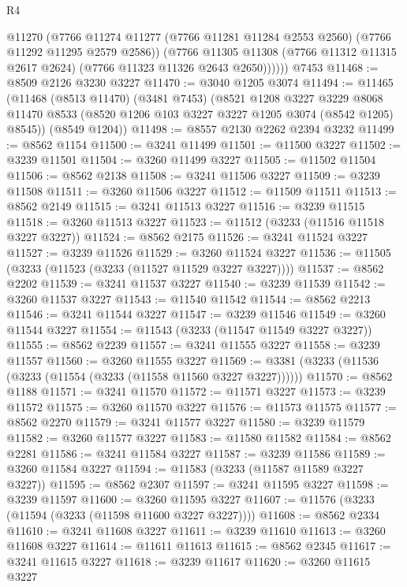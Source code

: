 \begin{lexlean}{R4}
\begin{coremodule}
            @11270
            (@7766
              @11274
              @11277
              (@7766 @11281 @11284 @2553 @2560)
              (@7766 @11292 @11295 @2579 @2586))
            (@7766
              @11305
              @11308
              (@7766 @11312 @11315 @2617 @2624)
              (@7766 @11323 @11326 @2643 @2650))))))
    @7453
@11468 := @8509 @2126 @3230 @3227
@11470 := @3040 @1205 @3074
@11494 := @11465
    (@11468
      (@8513 @11470)
      (@3481 @7453)
      (@8521
        @1208
        @3227
        @3229
        @8068
        @11470
        @8533
        (@8520 @1206 @103 @3227 @3227 @1205 @3074 (@8542 @1205) @8545))
      (@8549 @1204))
@11498 := @8557 @2130 @2262 @2394 @3232
@11499 := @8562 @1154
@11500 := @3241 @11499
@11501 := @11500 @3227
@11502 := @3239 @11501
@11504 := @3260 @11499 @3227
@11505 := @11502 @11504
@11506 := @8562 @2138
@11508 := @3241 @11506 @3227
@11509 := @3239 @11508
@11511 := @3260 @11506 @3227
@11512 := @11509 @11511
@11513 := @8562 @2149
@11515 := @3241 @11513 @3227
@11516 := @3239 @11515
@11518 := @3260 @11513 @3227
@11523 := @11512 (@3233 (@11516 @11518 @3227 @3227))
@11524 := @8562 @2175
@11526 := @3241 @11524 @3227
@11527 := @3239 @11526
@11529 := @3260 @11524 @3227
@11536 := @11505 (@3233 (@11523 (@3233 (@11527 @11529 @3227 @3227))))
@11537 := @8562 @2202
@11539 := @3241 @11537 @3227
@11540 := @3239 @11539
@11542 := @3260 @11537 @3227
@11543 := @11540 @11542
@11544 := @8562 @2213
@11546 := @3241 @11544 @3227
@11547 := @3239 @11546
@11549 := @3260 @11544 @3227
@11554 := @11543 (@3233 (@11547 @11549 @3227 @3227))
@11555 := @8562 @2239
@11557 := @3241 @11555 @3227
@11558 := @3239 @11557
@11560 := @3260 @11555 @3227
@11569 := @3381 (@3233 (@11536 (@3233 (@11554 (@3233 (@11558 @11560 @3227 @3227))))))
@11570 := @8562 @1188
@11571 := @3241 @11570
@11572 := @11571 @3227
@11573 := @3239 @11572
@11575 := @3260 @11570 @3227
@11576 := @11573 @11575
@11577 := @8562 @2270
@11579 := @3241 @11577 @3227
@11580 := @3239 @11579
@11582 := @3260 @11577 @3227
@11583 := @11580 @11582
@11584 := @8562 @2281
@11586 := @3241 @11584 @3227
@11587 := @3239 @11586
@11589 := @3260 @11584 @3227
@11594 := @11583 (@3233 (@11587 @11589 @3227 @3227))
@11595 := @8562 @2307
@11597 := @3241 @11595 @3227
@11598 := @3239 @11597
@11600 := @3260 @11595 @3227
@11607 := @11576 (@3233 (@11594 (@3233 (@11598 @11600 @3227 @3227))))
@11608 := @8562 @2334
@11610 := @3241 @11608 @3227
@11611 := @3239 @11610
@11613 := @3260 @11608 @3227
@11614 := @11611 @11613
@11615 := @8562 @2345
@11617 := @3241 @11615 @3227
@11618 := @3239 @11617
@11620 := @3260 @11615 @3227

\end{coremodule}
\end{lexlean}
